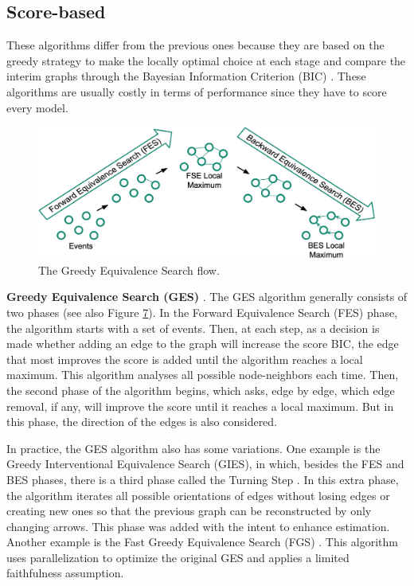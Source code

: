 \subsection{Score-based}
These algorithms differ from the previous ones because they are based on the greedy strategy to make the locally optimal choice at each stage and compare the interim graphs through the Bayesian Information Criterion (BIC) \cite{stoica2004model}. These algorithms are usually costly in terms of performance since they have to score every model.
\begin{figure}[H]
\centering
    \label{fig:ges}
    \includegraphics[width=\textwidth]{figures/ges.png}
    \caption{The Greedy Equivalence Search flow.}
\end{figure}
\textbf{Greedy Equivalence Search (GES)} \cite{chickering2002optimal}. The GES algorithm generally consists of two phases (see also Figure \hyperref[fig:ges]{7}). In the Forward Equivalence Search (FES) phase, the algorithm starts with a set of events. Then, at each step, as a decision is made whether adding an edge to the graph will increase the score BIC, the edge that most improves the score is added until the algorithm reaches a local maximum. This algorithm analyses all possible node-neighbors each time. Then, the second phase of the algorithm begins, which asks, edge by edge, which edge removal, if any, will improve the score until it reaches a local maximum. But in this phase, the direction of the edges is also considered. \newline
	
In practice, the GES algorithm also has some variations. One example is the Greedy Interventional Equivalence Search (GIES), in which, besides the FES and BES phases, there is a third phase called the Turning Step \cite{hauser2012characterization}. In this extra phase, the algorithm iterates all possible orientations of edges without losing edges or creating new ones so that the previous graph can be reconstructed by only changing arrows. This phase was added with the intent to enhance estimation. Another example is the Fast Greedy Equivalence Search (FGS) \cite{ramsey2017million}. This algorithm uses parallelization to optimize the original GES and applies a limited faithfulness assumption.
